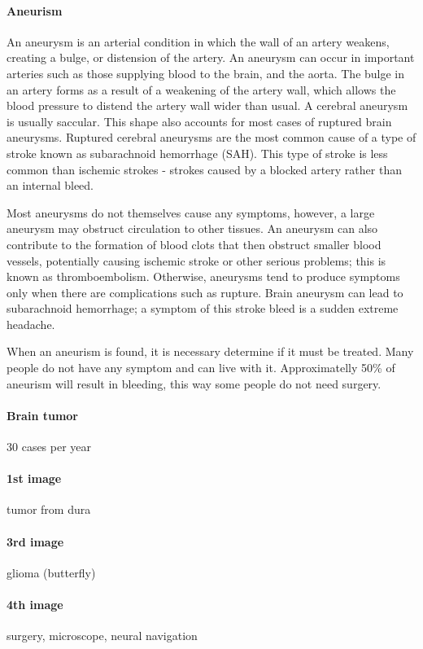 \documentclass[12pt,article,oneside,a4paper]{memoir}
\begin{document}
\paragraph{Aneurism} An aneurysm is an arterial condition in which the wall of an artery weakens, creating a bulge, or distension of the artery. An aneurysm can occur in important arteries such as those supplying blood to the brain, and the aorta. The bulge in an artery forms as a result of a weakening of the artery wall, which allows the blood pressure to distend the artery wall wider than usual. A cerebral aneurysm is usually saccular. This shape also accounts for most cases of ruptured brain aneurysms. Ruptured cerebral aneurysms are the most common cause of a type of stroke known as subarachnoid hemorrhage (SAH). This type of stroke is less common than ischemic strokes - strokes caused by a blocked artery rather than an internal bleed.

Most aneurysms do not themselves cause any symptoms, however, a large aneurysm may obstruct circulation to other tissues. An aneurysm can also contribute to the formation of blood clots that then obstruct smaller blood vessels, potentially causing ischemic stroke or other serious problems; this is known as thromboembolism. Otherwise, aneurysms tend to produce symptoms only when there are complications such as rupture. Brain aneurysm can lead to subarachnoid hemorrhage; a symptom of this stroke bleed is a sudden extreme headache.

When an aneurism is found, it is necessary determine if it must be treated. Many people do not have any symptom and can live with it. Approximatelly 50\%  of aneurism will result in bleeding, this way some people do not need surgery.

\paragraph{Brain tumor} 30 cases per year
\paragraph{1st image} tumor from dura
\paragraph{3rd image} glioma (butterfly)
\paragraph{4th image} surgery, microscope, neural navigation
\end{document}
